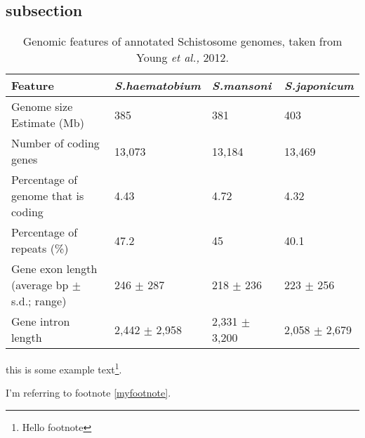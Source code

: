 \subsection{subsection}


\newpage



\begin{table} [h!]
\caption{Genomic features of annotated Schistosome genomes, taken from Young \textit{et al.,} 2012.}
\begin{tabular}{|
p{}|
p{}|
p{}|
p{}|} \hline 
Feature & \textit{S.haematobium} & \centering\arraybackslash{}\textit{S.mansoni} & \centering\arraybackslash{}\textit{S.japonicum} \\\hline 
Genome size Estimate (Mb) & \centering\arraybackslash{}385 & \centering\arraybackslash{}381 & \centering\arraybackslash{}403 \\\hline 
Number of coding genes & \centering\arraybackslash{}13,073 & \centering\arraybackslash{}13,184 & \centering\arraybackslash{}13,469 \\\hline 
Percentage of genome that is coding  & \centering\arraybackslash{}4.43 & \centering\arraybackslash{}4.72 & \centering\arraybackslash{}4.32 \\\hline 
Percentage of repeats (\%) & \centering\arraybackslash{}47.2 & \centering\arraybackslash{}45 & \centering\arraybackslash{}40.1 \\\hline 
Gene exon length (average bp ${\pm}$ s.d.; range) & \centering\arraybackslash{}246 ${\pm}$ 287 & \centering\arraybackslash{}218 ${\pm}$ 236 & \centering\arraybackslash{}223 ${\pm}$ 256 \\\hline 
Gene intron length  & \centering\arraybackslash{}2,442 ${\pm}$ 2,958 & \centering\arraybackslash{}2,331 ${\pm}$ 3,200 & \centering\arraybackslash{}2,058 ${\pm}$ 2,679 \\\hline 
\end{tabular}
\end{table}


this is some example text\footnote{Hello footnote}.

I'm referring to footnote \ref{myfootnote}.


